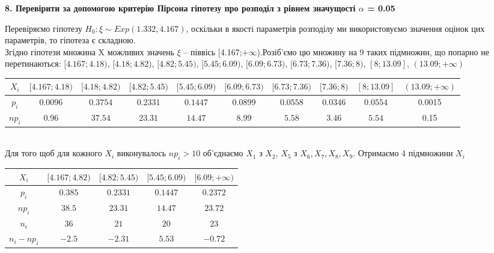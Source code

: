 \documentclass[11 pt]{article}
\begin{document}
\begin{center}
    \large
    \textbf{8. Перевірити за допомогою критерію Пірсона гіпотезу про розподіл з рівнем значущості $\alpha$ = 0.05}
\end{center} 
Перевіряємо гіпотезу $H_0: \xi \sim Exp(1.332, 4.167)$, оскільки в якості параметрів розподілу ми використовуємо значення оцінок цих параметрів, то гіпотеза є складною.\\ 
Згідно гіпотези множина X можливих значень $\xi$ -- піввісь [4.167;$ +\infty $).Розіб'ємо 
цю множину на 9 таких підмножин, що попарно не перетинаються:
$[4.167; 4.18)$, $[4.18; 4.82)$, $[4.82; 5.45)$, $[5.45; 6.09)$, $[6.09; 6.73)$, $[6.73; 7.36)$, $[7.36;8)$, $[8; 13.09]$, $(13.09; +\infty)$   
\begin{table}[H]
	\begin{adjustbox}{width=\columnwidth,center}
		\begin{tabular}{|c|c|c|c|c|c|c|c|c|c|}\hline 
            $X_i$  & 
            $[4.167; 4.18)$ & $[4.18; 4.82)$ & $[4.82; 5.45)$ & $[5.45; 6.09)$ & $[6.09; 6.73)$ & $[6.73; 7.36)$
            & $[7.36;8)$ & $[8; 13.09]$ & $(13.09;+\infty)$ 
            \\ \hline
			$p_i$ &0.0096&$0.3754$&$0.2331$&$0.1447$&$0.0899$&$0.0558$&$0.0346$&$0.0554$&0.0015 \\ \hline
			$n p_i$ &0.96&$37.54$&$23.31$&$14.47$&$8.99$&$5.58$&$3.46$&$5.54$&0.15 \\ \hline
		\end{tabular}
	\end{adjustbox}
\end{table}
\ \\
Для того щоб для кожного $X_i$ виконувалось $n p_i >10$ об'єднаємо $X_1$ з $X_2$, 
$X_5 \text{ з }  X_6, X_7 , X_8 , X_9 $. Отримаємо 4 підмножини $X_i$
\begin{table}[H]
	\begin{center}
		\begin{tabular}{|c|c|c|c|c|}\hline 
            $X_i$  & 
            $[4.167; 4.82)$ & $[4.82; 5.45)$ & $[5.45; 6.09)$ & $[6.09; +\infty)$ \\ \hline
			$p_i$ &$0.385$&$0.2331$&$0.1447$&$0.2372$ \\ \hline
			$n p_i$ &$38.5$&$23.31$&$14.47$&$23.72$ \\ \hline
            $n_i$ &$36$&$21$&$20$&$23$ \\ \hline
            $n_i - n p_i$ &$-2.5$&$-2.31$&$5.53$&$-0.72$ \\ \hline
		\end{tabular}
	\end{center}
\end{table}
\end{document}
